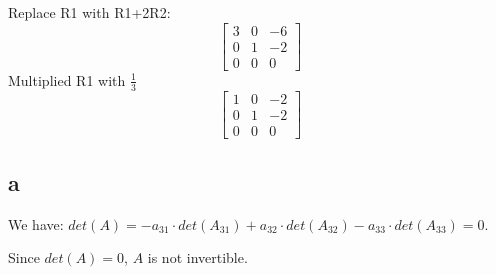\documentclass[10pt]{article}
\begin{document}
\noindent Replace R1 with R1+2R2:
\begin{equation*}
    \begin{bmatrix}
        3 & 0 & -6 \\
        0 & 1 & -2 \\
        0 & 0 & 0 
    \end{bmatrix}
\end{equation*}
\noindent Multiplied R1 with $\frac{1}{3}$
\begin{equation*}
    \begin{bmatrix}
        1 & 0 & -2 \\
        0 & 1 & -2 \\
        0 & 0 & 0 
    \end{bmatrix}
\end{equation*}

\subsection*{a}
We have: $det(A) = -a_{31}\cdot det(A_{31}) + a_{32}\cdot det(A_{32}) - a_{33}\cdot det(A_{33}) = 0$. \par
\noindent Since $det(A) = 0$, $A$ is not invertible.
\end{document}

